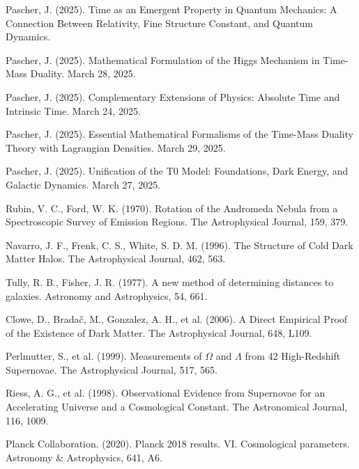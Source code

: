 \documentclass[a4paper,12pt]{article}
\begin{document}
	\begin{thebibliography}{99}
		
		 Pascher, J. (2025). Time as an Emergent Property in Quantum Mechanics: A Connection Between Relativity, Fine Structure Constant, and Quantum Dynamics.
		
		 Pascher, J. (2025). Mathematical Formulation of the Higgs Mechanism in Time-Mass Duality. March 28, 2025.
		
		 Pascher, J. (2025). Complementary Extensions of Physics: Absolute Time and Intrinsic Time. March 24, 2025.
		
		 Pascher, J. (2025). Essential Mathematical Formalisms of the Time-Mass Duality Theory with Lagrangian Densities. March 29, 2025.
		
		 Pascher, J. (2025). Unification of the T0 Model: Foundations, Dark Energy, and Galactic Dynamics. March 27, 2025.
		
		 Rubin, V. C., Ford, W. K. (1970). Rotation of the Andromeda Nebula from a Spectroscopic Survey of Emission Regions. The Astrophysical Journal, 159, 379.
		
		 Navarro, J. F., Frenk, C. S., White, S. D. M. (1996). The Structure of Cold Dark Matter Halos. The Astrophysical Journal, 462, 563.
		
		 Tully, R. B., Fisher, J. R. (1977). A new method of determining distances to galaxies. Astronomy and Astrophysics, 54, 661.
		
		 Clowe, D., Bradač, M., Gonzalez, A. H., et al. (2006). A Direct Empirical Proof of the Existence of Dark Matter. The Astrophysical Journal, 648, L109.
		
		 Perlmutter, S., et al. (1999). Measurements of $\Omega$ and $\Lambda$ from 42 High-Redshift Supernovae. The Astrophysical Journal, 517, 565.
		
		 Riess, A. G., et al. (1998). Observational Evidence from Supernovae for an Accelerating Universe and a Cosmological Constant. The Astronomical Journal, 116, 1009.
		
		 Planck Collaboration. (2020). Planck 2018 results. VI. Cosmological parameters. Astronomy \& Astrophysics, 641, A6.
		
	\end{thebibliography}
	
\end{document}
